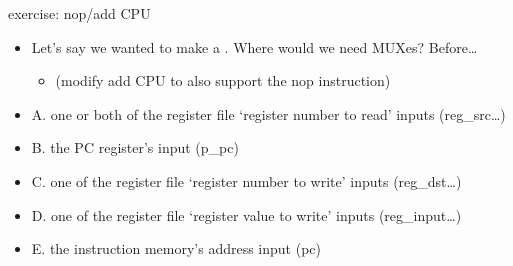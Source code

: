 \begin{frame}{exercise: nop/add CPU}
\begin{itemize}
\item Let's say we wanted to make a . Where would we need MUXes? Before\ldots
    \begin{itemize}
    \item \small (modify add CPU to also support the nop instruction)
    \end{itemize}
\vspace{.5cm}
\item A. one or both of the register file `register number to read' inputs {\small (reg\_src\ldots)}
\item B. the PC register's input {\small (p\_pc)}
\item C. one of the register file `register number to write' inputs {\small (reg\_dst\ldots)}
\item D. one of the register file `register value to write' inputs {\small (reg\_input\ldots)}
\item E. the instruction memory's address input {\small (pc)}
\end{itemize}
\end{frame}
